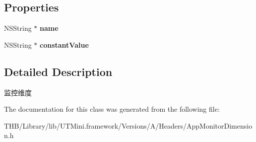 \subsection*{Properties}
\begin{DoxyCompactItemize}
\item 
\mbox{\label{interface_app_monitor_dimension_adc9b942144438a848a440d9937fc3edd}} 
N\+S\+String $\ast$ {\bfseries name}
\item 
\mbox{\label{interface_app_monitor_dimension_a026f2e0dbf16526b5bd85db13216700a}} 
N\+S\+String $\ast$ {\bfseries constant\+Value}
\end{DoxyCompactItemize}


\subsection{Detailed Description}
监控维度 

The documentation for this class was generated from the following file\+:\begin{DoxyCompactItemize}
\item 
T\+H\+B/\+Library/lib/\+U\+T\+Mini.\+framework/\+Versions/\+A/\+Headers/App\+Monitor\+Dimension.\+h\end{DoxyCompactItemize}
